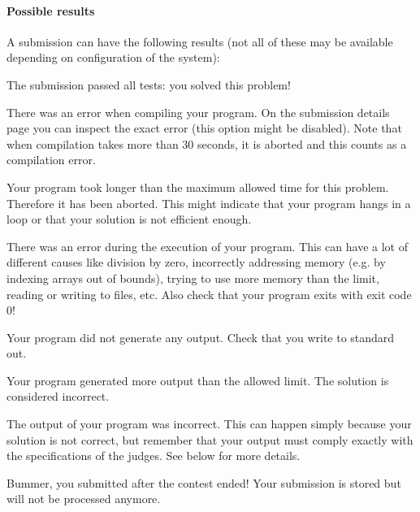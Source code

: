 \documentclass[a4paper,10pt,english,openany]{sphinxmanual}
\begin{document}
\paragraph{Possible results}
\label{\detokenize{team:possible-results}}
\sphinxAtStartPar
A submission can have the following results (not all of these may be
available depending on configuration of the system):
\begin{description}
\sphinxAtStartPar
The submission passed all tests: you solved this problem!

\sphinxAtStartPar
There was an error when compiling your program. On the submission
details page you can inspect the exact error (this option might be
disabled).
Note that when compilation takes more than 30 seconds,
it is aborted and this counts as a compilation error.

\sphinxAtStartPar
Your program took longer than the maximum allowed time for this
problem. Therefore it has been aborted. This might indicate that your
program hangs in a loop or that your solution is not efficient
enough.

\sphinxAtStartPar
There was an error during the execution of your program. This can have
a lot of different causes like division by zero, incorrectly
addressing memory (e.g. by indexing arrays out of bounds), trying to
use more memory than the limit, reading or writing to files, etc.
Also check that your program exits with exit code 0!

\sphinxAtStartPar
Your program did not generate any output. Check that you write to
standard out.

\sphinxAtStartPar
Your program generated more output than the allowed limit. The solution
is considered incorrect.

\sphinxAtStartPar
The output of your program was incorrect. This can happen simply
because your solution is not correct, but remember that your output
must comply exactly with the specifications of the judges. See
{\hyperref[\detokenize{team:testing}]{}} below for more details.

\sphinxAtStartPar
Bummer, you submitted after the contest ended! Your submission is
stored but will not be processed anymore.

\end{description}
\end{document}
